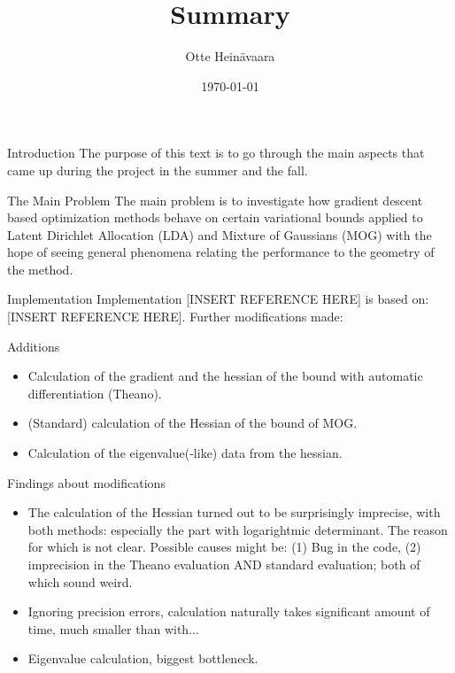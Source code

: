 \documentclass[11pt]{article}
\title{Summary}
\author{Otte Heinävaara}
\date{\today}
\begin{document}
\maketitle

\begin{section}{Introduction}
\noindent
The purpose of this text is to go through the main aspects that came up during the project in the summer and the fall.
\end{section}

\begin{section}{The Main Problem}
	\noindent
	The main problem is to investigate how gradient descent based optimization methods behave on certain variational bounds applied to Latent Dirichlet Allocation (LDA) and Mixture of Gaussians (MOG) with the hope of seeing general phenomena relating the performance to the geometry of the method.
\end{section}

\begin{section}{Implementation}
	\noindent
	Implementation [INSERT REFERENCE HERE] is based on: [INSERT REFERENCE HERE].
	Further modifications made:
	\begin{subsection}{Additions}
		\begin{itemize}
			\item Calculation of the gradient and the hessian of the bound with automatic differentiation (Theano).
			\item (Standard) calculation of the Hessian of the bound of MOG.
			\item Calculation of the eigenvalue(-like) data from the hessian.
		\end{itemize}
	\end{subsection}
	\begin{subsection}{Findings about modifications}
		\begin{itemize}
			\item The calculation of the Hessian turned out to be surprisingly imprecise, with both methods: especially the part with logarightmic determinant. The reason for which is not clear. Possible causes might be: (1) Bug in the code, (2) imprecision in the Theano evaluation AND standard evaluation; both of which sound weird.
			\item Ignoring precision errors, calculation naturally takes significant amount of time, much smaller than with... 
			\item Eigenvalue calculation, biggest bottleneck.
		\end{itemize}
	\end{subsection}
\end{section}
\end{document}
